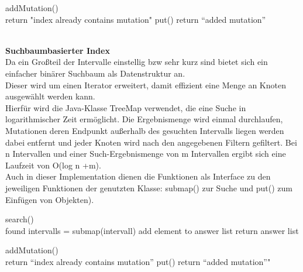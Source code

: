 \begin{algorithm}
addMutation()\\{
{return "index already contains mutation"\;}
put()\;
return \enquote{added mutation}\;
}
\end{algorithm}

\newpage
\hfill\\
\textbf{Suchbaumbasierter Index}\\
Da ein Großteil der Intervalle einstellig bzw sehr kurz sind bietet sich ein einfacher binärer Suchbaum als Datenstruktur an.\\
Dieser wird um einen Iterator erweitert, damit effizient eine Menge an Knoten ausgewählt werden kann.\\
Hierfür wird die Java-Klasse TreeMap verwendet, die eine Suche in logarithmischer Zeit ermöglicht. Die Ergebnismenge wird einmal durchlaufen, Mutationen deren Endpunkt außerhalb des gesuchten Intervalls liegen werden dabei entfernt und jeder Knoten wird nach den angegebenen Filtern gefiltert. Bei n Intervallen und einer Such-Ergebnismenge von m Intervallen ergibt sich eine Laufzeit von O(log n +m).\\
Auch in dieser Implementation dienen die Funktionen als Interface zu den jeweiligen Funktionen der genutzten Klasse: submap() zur Suche und put() zum Einfügen von Objekten).
\begin{algorithm}
search()\\{
found intervalls = submap(intervall)\;
{
{
{add element to answer list\;}
}
return answer list\;
}
}
\end{algorithm}


\begin{algorithm}
addMutation()\\{
{return \enquote{index already contains mutation}\;}
put()\;
return \enquote{added mutation}"\;
}
\end{algorithm}

